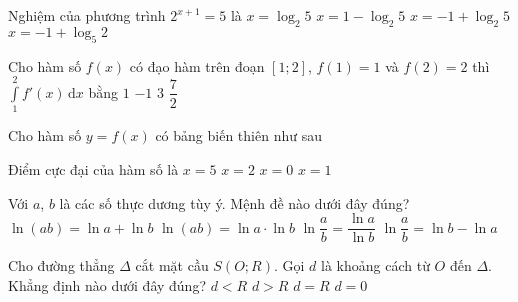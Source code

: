 \begin{ex}%
	Nghiệm của phương trình $2^{x+1}=5$ là
	\choice
	{$x=\log _{2}5$}
	{$x=1-\log _{2}5$}
	{\True $x=-1+\log _{2}5$}
	{$x=-1+\log _{5}2$}
\end{ex}

\begin{ex}%
	Cho hàm số $f(x)$ có đạo hàm trên đoạn $[1;2]$, $f(1)=1$ và $f(2)=2$ thì $\displaystyle\int\limits_1^2 f'(x) \mathrm{\,d}x$ bằng
	\choice
	{\True $1$}
	{$-1$}
	{$3$}
	{$\dfrac{7}{2}$}
\end{ex}

\begin{ex}%
	Cho hàm số $y=f(x)$ có bảng biến thiên như sau
	\begin{center}
	\end{center}
	Điểm cực đại của hàm số là
	\choice
	{$x=5$}
	{\True $x=2$}
	{$x=0$}
	{$x=1$}
\end{ex}

\begin{ex}%
Với $a$, $b$ là các số thực dương tùy ý. Mệnh đề nào dưới đây đúng?
\choice
{\True $\ln(ab)=\ln a+\ln b$}
{$\ln(ab)=\ln a\cdot\ln b$}
{$\ln \dfrac{a}{b}=\dfrac{\ln a}{\ln b}$}
{$\ln \dfrac{a}{b}=\ln b-\ln a$}
\end{ex}

\begin{ex}%
	Cho đường thẳng $\Delta$ cắt mặt cầu $S(O;R)$. Gọi $d$ là khoảng cách từ $O$ đến $\Delta$. Khẳng định nào dưới đây đúng?
	\choice
	{\True $d<R$}
	{$d>R$}
	{$d=R$}
	{$d=0$}
\end{ex}

